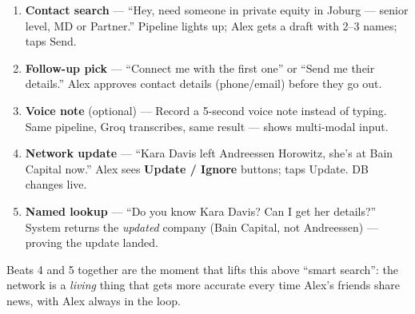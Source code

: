 \documentclass[11pt]{article}
\begin{document}
\begin{enumerate}
    \item \textbf{Contact search} --- ``Hey, need someone in private equity in Joburg --- senior level, MD or Partner.'' Pipeline lights up; Alex gets a draft with 2--3 names; taps Send.
    \item \textbf{Follow-up pick} --- ``Connect me with the first one'' or ``Send me their details.'' Alex approves contact details (phone/email) before they go out.
    \item \textbf{Voice note} (optional) --- Record a 5-second voice note instead of typing. Same pipeline, Groq transcribes, same result --- shows multi-modal input.
    \item \textbf{Network update} --- ``Kara Davis left Andreessen Horowitz, she's at Bain Capital now.'' Alex sees \textbf{Update / Ignore} buttons; taps Update. DB changes live.
    \item \textbf{Named lookup} --- ``Do you know Kara Davis? Can I get her details?'' System returns the \emph{updated} company (Bain Capital, not Andreessen) --- proving the update landed.
\end{enumerate}

Beats 4 and 5 together are the moment that lifts this above ``smart search'': the network is a \emph{living} thing that gets more accurate every time Alex's friends share news, with Alex always in the loop.
\end{document}
